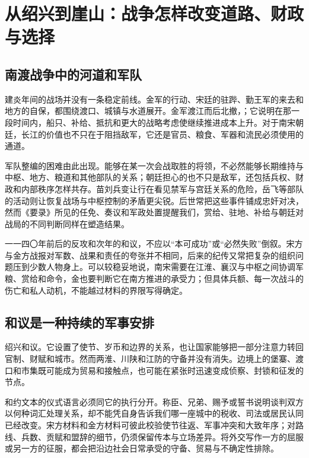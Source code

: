 \section{从绍兴到崖山：战争怎样改变道路、财政与选择}

\subsection{南渡战争中的河道和军队}

建炎年间的战场并没有一条稳定前线。金军的行动、宋廷的驻跸、勤王军的来去和地方的自保，都围绕渡口、城镇与水道展开。金军渡江而后北撤，；它说明在那一段时间内，船只、补给、抵抗和更大的战略考虑使继续推进成本上升。对于南宋朝廷，长江的价值也不只在于阻挡敌军，它还是官员、粮食、军器和流民必须使用的通道。

军队整编的困难由此出现。能够在某一次会战取胜的将领，不必然能够长期维持与中枢、地方、粮道和其他部队的关系；朝廷担心的也不只是敌军，还包括兵权、财政和内部秩序怎样共存。苗刘兵变让行在看见禁军与宫廷关系的危险，岳飞等部队的活动则让恢复战场与中枢控制的矛盾更尖锐。后世常把这些事件铺成忠奸对决，然而《要录》所见的任免、奏议和军政处置提醒我们，赏给、驻地、补给与朝廷对战局的不同判断同样在塑造结果。

一一四〇年前后的反攻和次年的和议，不应以“本可成功”或“必然失败”倒叙。宋方与金方战报对军数、战果和责任的夸张并不相同，后来的纪传又常把复杂的组织问题压到少数人物身上。可以较稳妥地说，南宋需要在江淮、襄汉与中枢之间协调军粮、赏给和命令，金也要判断它在南方推进的承受力；但具体兵额、每一次战斗的伤亡和私人动机，不能越过材料的界限写得确定。

\subsection{和议是一种持续的军事安排}

绍兴和议。它设置了使节、岁币和边界的关系，也让国家能够把一部分注意力转回官制、财赋和城市。然而两淮、川陕和江防的守备并没有消失。边境上的堡寨、渡口和市集既可能成为贸易和接触点，也可能在紧张时迅速变成侦察、封锁和征发的节点。

和约文本的仪式语言必须同它的执行分开。称臣、兄弟、赐予或誓书说明谈判双方以何种词汇处理关系，却不能凭自身告诉我们哪一座城中的税收、司法或居民认同已经改变。宋方材料和金方材料可彼此校验使节往返、军事冲突和大致年序；对路线、兵数、贡赋和盟辞的细节，仍须保留传本与立场差异。将外交写作一方的屈服或另一方的征服，都会把沿边社会日常承受的守备、贸易与不确定性排除。

